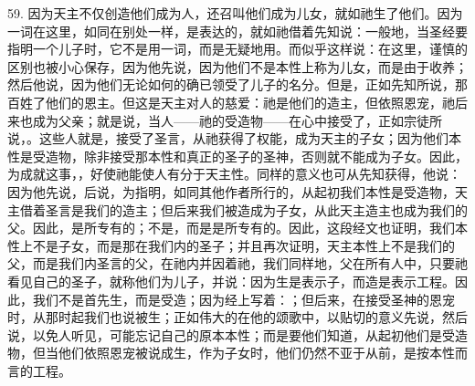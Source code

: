 59. 因为天主不仅创造他们成为人，还召叫他们成为儿女，就如祂生了他们。因为一词在这里，如同在别处一样，是表达的，就如祂借着先知说：一般地，当圣经要指明一个儿子时，它不是用一词，而是无疑地用。而似乎这样说：在这里，谨慎的区别也被小心保存，因为他先说，因为他们不是本性上称为儿女，而是由于收养；然后他说，因为他们无论如何的确已领受了儿子的名分。但是，正如先知所说，那百姓了他们的恩主。但这是天主对人的慈爱：祂是他们的造主，但依照恩宠，祂后来也成为父亲；就是说，当人——祂的受造物——在心中接受了，正如宗徒所说，。这些人就是，接受了圣言，从祂获得了权能，成为天主的子女；因为他们本性是受造物，除非接受那本性和真正的圣子的圣神，否则就不能成为子女。因此，为成就这事，，好使祂能使人有分于天主性。同样的意义也可从先知获得，他说：因为他先说，后说，为指明，如同其他作者所行的，从起初我们本性是受造物，天主借着圣言是我们的造主；但后来我们被造成为子女，从此天主造主也成为我们的父。因此，是所专有的；不是，而是是所专有的。因此，这段经文也证明，我们本性上不是子女，而是那在我们内的圣子；并且再次证明，天主本性上不是我们的父，而是我们内圣言的父，在祂内并因着祂，我们同样地，父在所有人中，只要祂看见自己的圣子，就称他们为儿子，并说：因为生是表示子，而造是表示工程。因此，我们不是首先生，而是受造；因为经上写着：；但后来，在接受圣神的恩宠时，从那时起我们也说被生；正如伟大的在他的颂歌中，以贴切的意义先说，然后说，以免人听见，可能忘记自己的原本本性；而是要他们知道，从起初他们是受造物，但当他们依照恩宠被说成生，作为子女时，他们仍然不亚于从前，是按本性而言的工程。\par

